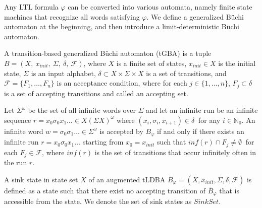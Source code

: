\documentclass[a4j,12pt,oneside,openany,english]{jsbook}
\begin{document}
Any LTL formula $\varphi$ can be converted into various automata, namely finite state machines that recognize %
all words satisfying $\varphi$.
 We define a generalized B\"{u}chi automaton at the beginning, and then introduce a limit-deterministic B\"{u}chi automaton.

\begin{definition}
  A transition-based generalized B\"{u}chi automaton (tGBA) is a tuple $B = (X,\ x_{init},\ \Sigma,\ \delta,\ \mathcal{F})$, where $X$ is a finite set of states, $x_{init} \in X$ is the initial state, $\Sigma$ is an input alphabet, $\delta \subset  X\times \Sigma \times X$ is a set of transitions, and $\mathcal{F} = \{F_1,\ldots,F_n\}$ is an acceptance condition, where for each $ j \in \{1,\ldots,n\}$, $F_j \subset \delta$ is a set of accepting transitions and called an accepting set.

  Let $\Sigma^{\omega}$ be the set of all infinite words over $\Sigma$ and let an infinite run be an infinite sequence $r = x_0\sigma_0x_1 \ldots \in X (\Sigma X)^{\omega}$ where $(x_i, \sigma_{i}, x_{i+1}) \in \delta\ $ for any $ i\in \mathbb{N}_0$. An infinite word $w = \sigma_0\sigma_1 \ldots \in \Sigma^{\omega}$ is accepted by $B_{\varphi}$ if and only if there exists an infinite run $r = x_0 \sigma_0 x_1 \ldots$ starting from $x_0 = x_{init}$ such that $inf(r) \cap F_j \neq \emptyset\ $ for each $F_j \in \mathcal{F}$, where $inf(r)$ is the set of transitions that occur infinitely often in the run $r$.
\end{definition}

\begin{definition}
A sink state in state set $X$ of an augmented tLDBA $\bar{B}_{\varphi} = (\bar{X}, \bar{x}_{init},\bar{\Sigma},\bar{\delta},\bar{\mathcal{F}})$ is defined as a state such that there exist no accepting transition of $\bar{B}_{\varphi}$ that is accessible from the state. We denote the set of sink states as $Sink Set$.
\end{definition}
\end{document}
